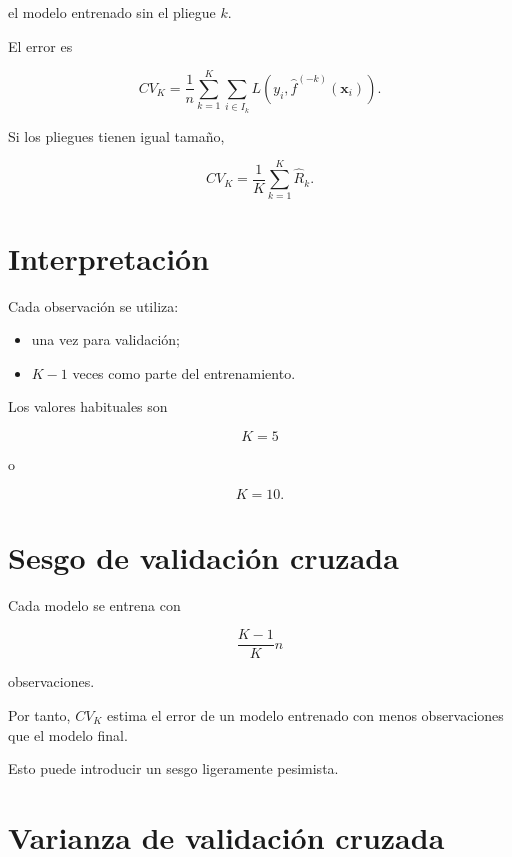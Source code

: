 \documentclass[
  spanish,
  10.5pt,
  letterpaper,
  DIV=11,
  numbers=noendperiod,
  oneside,
  open=any]{scrreprt}
\providecommand{\tightlist}{%
  \setlength{\itemsep}{0pt}\setlength{\parskip}{0pt}}
\theoremstyle{definition}
\theoremstyle{definition}
\theoremstyle{plain}
\theoremstyle{remark}
\begin{document}
el modelo entrenado sin el pliegue \(k\).

El error es

\[
CV_K
=
\frac{1}{n}
\sum_{k=1}^{K}
\sum_{i\in I_k}
L
\left(
y_i,
\widehat{f}^{(-k)}(\mathbf{x}_i)
\right).
\]

Si los pliegues tienen igual tamaño,

\[
CV_K
=
\frac{1}{K}
\sum_{k=1}^{K}
\widehat{R}_k.
\]

\section*{Interpretación}\label{interpretaciuxf3n}


Cada observación se utiliza:

\begin{itemize}
\tightlist
\item
  una vez para validación;
\item
  \(K-1\) veces como parte del entrenamiento.
\end{itemize}

Los valores habituales son

\[
K=5
\]

o

\[
K=10.
\]

\section*{Sesgo de validación
cruzada}\label{sesgo-de-validaciuxf3n-cruzada}


Cada modelo se entrena con

\[
\frac{K-1}{K}n
\]

observaciones.

Por tanto, \(CV_K\) estima el error de un modelo entrenado con menos
observaciones que el modelo final.

Esto puede introducir un sesgo ligeramente pesimista.

\section*{Varianza de validación
cruzada}\label{varianza-de-validaciuxf3n-cruzada}
\end{document}
